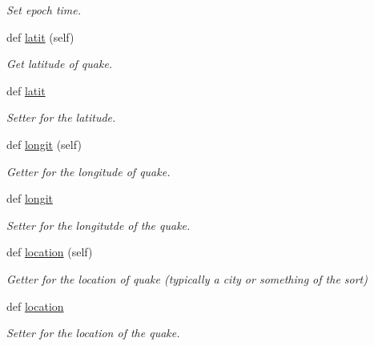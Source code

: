 \begin{DoxyCompactItemize}
\begin{DoxyCompactList}\small\item\em Set epoch time. \end{DoxyCompactList}\item 
def \hyperlink{classbridges_1_1data__src__dependent_1_1earthquake__usgs_1_1_earthquake_u_s_g_s_ab582eb6b2e8836e10c35f60e14d128d0}{latit} (self)
\begin{DoxyCompactList}\small\item\em Get latitude of quake. \end{DoxyCompactList}\item 
def \hyperlink{classbridges_1_1data__src__dependent_1_1earthquake__usgs_1_1_earthquake_u_s_g_s_aff234b9c32bedb8dc8e339de82dc46ef}{latit}
\begin{DoxyCompactList}\small\item\em Setter for the latitude. \end{DoxyCompactList}\item 
def \hyperlink{classbridges_1_1data__src__dependent_1_1earthquake__usgs_1_1_earthquake_u_s_g_s_a98a8f3ee07d05b57c5028b2bad8be9bf}{longit} (self)
\begin{DoxyCompactList}\small\item\em Getter for the longitude of quake. \end{DoxyCompactList}\item 
def \hyperlink{classbridges_1_1data__src__dependent_1_1earthquake__usgs_1_1_earthquake_u_s_g_s_afbd9e47192dbf4b27f694297b83697c6}{longit}
\begin{DoxyCompactList}\small\item\em Setter for the longitutde of the quake. \end{DoxyCompactList}\item 
def \hyperlink{classbridges_1_1data__src__dependent_1_1earthquake__usgs_1_1_earthquake_u_s_g_s_a3b8f61c92ee3c13d3cd54bc264378882}{location} (self)
\begin{DoxyCompactList}\small\item\em Getter for the location of quake (typically a city or something of the sort) \end{DoxyCompactList}\item 
def \hyperlink{classbridges_1_1data__src__dependent_1_1earthquake__usgs_1_1_earthquake_u_s_g_s_a3004af322cb3d2179f17ce0210571c22}{location}
\begin{DoxyCompactList}\small\item\em Setter for the location of the quake. \end{DoxyCompactList}\item 

\end{DoxyCompactItemize}
